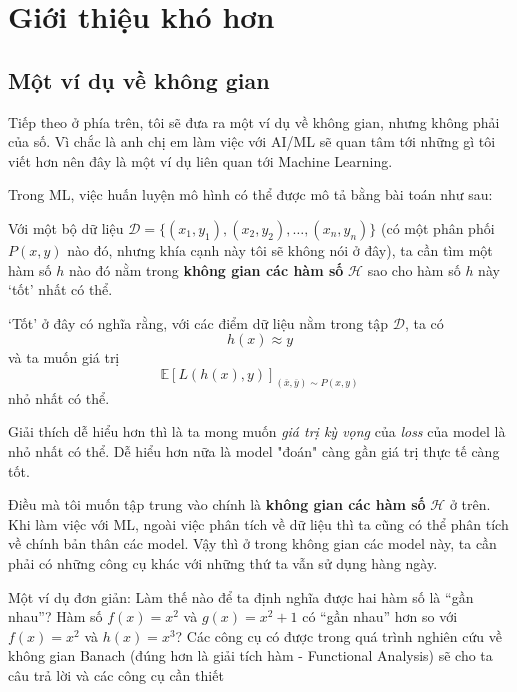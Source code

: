 \documentclass[a4paper,12pt]{article}
\begin{document}
\section{Giới thiệu khó hơn}

\subsection*{Một ví dụ về không gian}
Tiếp theo ở phía trên, tôi sẽ đưa ra một ví dụ về không gian, nhưng không phải của số.
Vì chắc là anh chị em làm việc với AI/ML sẽ quan tâm tới những gì tôi viết hơn nên đây
là một ví dụ liên quan tới Machine Learning.

Trong ML, việc huấn luyện mô hình có thể được mô tả bằng bài toán như sau:

\begin{mdframed}
  Với một bộ dữ liệu \(\mathcal{D} = \{ (x_1, y_1), (x_2, y_2), \ldots, (x_n, y_n) \}\)
  (có một phân phối \(P(x, y)\) nào đó, nhưng khía cạnh này tôi sẽ không nói ở đây),
  ta cần tìm một hàm số \(h\) nào đó nằm trong \textbf{không gian các hàm số} \(\mathcal{H}\)
  sao cho hàm số \(h\) này `tốt' nhất có thể.

  `Tốt' ở đây có nghĩa rằng, với các điểm dữ liệu nằm trong tập \(\mathcal{D}\), ta có
  \[
    h(x) \approx y
  \]
  và ta muốn giá trị
  \begin{equation}\label{eq:eq-1}
    \mathbb{E}[L(h(x), y)]_{(\overline{x} , \overline{y} ) \sim P(x , y)}
  \end{equation}
  nhỏ nhất có thể.

  Giải thích dễ hiểu hơn thì là ta mong muốn \emph{giá trị kỳ vọng}
  của \emph{loss} của model là nhỏ nhất có thể. Dễ hiểu hơn nữa là model "đoán" càng gần
  giá trị thực tế càng tốt.
\end{mdframed}

Điều mà tôi muốn tập trung vào chính là
\textbf{không gian các hàm số} \(\mathcal{H}\) ở trên. Khi làm việc với ML, ngoài việc
phân tích về dữ liệu thì ta cũng có thể phân tích về chính bản thân các model. Vậy thì ở trong
không gian các model này, ta cần phải có những công cụ khác với những thứ ta vẫn sử dụng hàng ngày.

Một ví dụ đơn giản: Làm thế nào để ta định nghĩa được hai hàm số là ``gần nhau''?
Hàm số \(f(x) = x^2\) và \(g(x) = x^2 + 1\) có ``gần nhau'' hơn so với \(f(x) = x^2\) và
\(h(x) = x^3\)? Các công cụ có được trong quá trình nghiên cứu về không gian Banach
(đúng hơn là giải tích hàm - Functional Analysis) sẽ cho ta câu trả lời và các công cụ cần thiết
\end{document}
